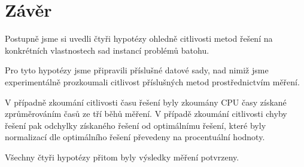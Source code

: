 \documentclass[12pt]{article}
\begin{document}
\section{Závěr}

Postupně jsme si uvedli čtyři hypotézy ohledně citlivosti metod řešení na konkrétních vlastnostech sad instancí problémů batohu.

Pro tyto hypotézy jsme připravili příslušné datové sady, nad nimiž jsme experimentálně prozkoumali citlivost příslušných metod prostřednictvím měření.

V případně zkoumání citlivosti času řešení byly zkoumány CPU časy získané zprůměrováním časů ze tří běhů měření. V případě zkoumání citlivosti chyby řešení pak odchylky získaného řešení od optimálnímu řešení, které byly normalizací dle optimálního řešení převedeny na procentuální hodnoty.

Všechny čtyři hypotézy přitom byly výsledky měření potvrzeny.
\end{document}
